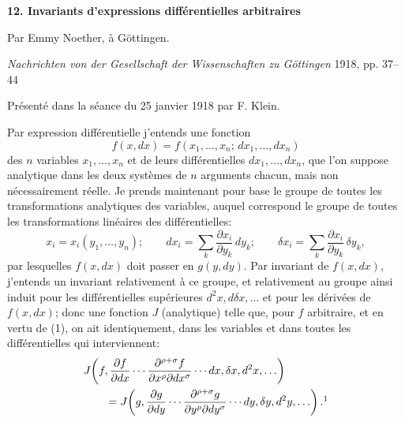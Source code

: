 \providecommand{\bdelta}{\bar{\delta}}
\begin{center}
{\Large\bfseries 12. Invariants d'expressions différentielles arbitraires}\par
\vspace{0.8em}
Par Emmy Noether, à Göttingen.\par
\vspace{1.5em}
\emph{Nachrichten von der Gesellschaft der Wissenschaften zu Göttingen} 1918, pp. 37--44
\end{center}

\vspace{3em}
\begin{center}
Présenté dans la séance du 25 janvier 1918 par F. Klein.
\end{center}

Par expression différentielle j'entends une fonction
\[
f(x,dx)=f(x_1,\ldots,x_n;\,dx_1,\ldots,dx_n)
\]
des \(n\) variables \(x_1,\ldots,x_n\) et de leurs différentielles
\(dx_1,\ldots,dx_n\), que l'on suppose analytique dans les deux systèmes
de \(n\) arguments chacun, mais non nécessairement réelle. Je prends
maintenant pour base le groupe de toutes les transformations analytiques
des variables, auquel correspond le groupe de toutes les transformations
linéaires des différentielles:
\begin{equation}
x_i=x_i(y_1,\ldots,y_n);\qquad
dx_i=\sum_k\frac{\partial x_i}{\partial y_k}\,dy_k;\qquad
\delta x_i=\sum_k\frac{\partial x_i}{\partial y_k}\,\delta y_k,
\tag{1}
\end{equation}
par lesquelles \(f(x,dx)\) doit passer en \(g(y,dy)\). Par invariant de
\(f(x,dx)\), j'entends un invariant relativement à ce groupe, et relativement
au groupe ainsi induit pour les différentielles supérieures
\(d^2x,d\delta x,\ldots\) et pour les dérivées de \(f(x,dx)\); donc une fonction
\(J\) (analytique) telle que, pour \(f\) arbitraire, et en vertu de (1),
on ait identiquement, dans les variables et dans toutes les différentielles
qui interviennent:
\[
\begin{aligned}
&J\!\left(f,\frac{\partial f}{\partial dx}\cdots
\frac{\partial^{\rho+\sigma}f}{\partial x^\rho\partial dx^\sigma}
\cdots dx,\delta x,d^2x,\ldots\right)\\
&\qquad =
J\!\left(g,\frac{\partial g}{\partial dy}\cdots
\frac{\partial^{\rho+\sigma}g}{\partial y^\rho\partial dy^\sigma}
\cdots dy,\delta y,d^2y,\ldots\right).\footnotemark
\end{aligned}
\]

